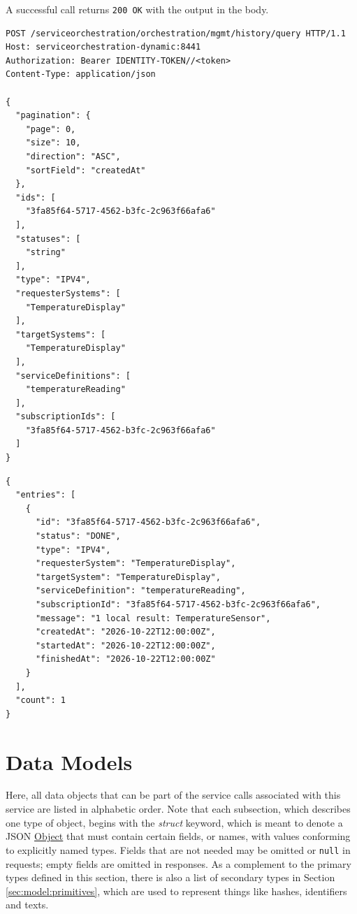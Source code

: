 \documentclass[a4paper]{arrowhead}
\newcommand{\oref}[1]{{\textcolor{ArrowheadBlue}{\hyperref[sec:operations:#1]{#1}}}}
\newcommand{\pref}[1]{{\textcolor{ArrowheadGrey}{\hyperref[sec:model:primitives:#1]{#1}}}}
\begin{document}
A successful call returns \texttt{200 OK} with the output in the body.

\begin{lstlisting}[label={lst:query},caption={An \oref{query} invocation.}]
POST /serviceorchestration/orchestration/mgmt/history/query HTTP/1.1
Host: serviceorchestration-dynamic:8441
Authorization: Bearer IDENTITY-TOKEN//<token>
Content-Type: application/json

{
  "pagination": {
    "page": 0,
    "size": 10,
    "direction": "ASC",
    "sortField": "createdAt"
  },
  "ids": [
    "3fa85f64-5717-4562-b3fc-2c963f66afa6"
  ],
  "statuses": [
    "string"
  ],
  "type": "IPV4",
  "requesterSystems": [
    "TemperatureDisplay"
  ],
  "targetSystems": [
    "TemperatureDisplay"
  ],
  "serviceDefinitions": [
    "temperatureReading"
  ],
  "subscriptionIds": [
    "3fa85f64-5717-4562-b3fc-2c963f66afa6"
  ]
}
\end{lstlisting}

\begin{lstlisting}[label={lst:query-resp},caption={An \oref{query} response.}]
{
  "entries": [
    {
      "id": "3fa85f64-5717-4562-b3fc-2c963f66afa6",
      "status": "DONE",
      "type": "IPV4",
      "requesterSystem": "TemperatureDisplay",
      "targetSystem": "TemperatureDisplay",
      "serviceDefinition": "temperatureReading",
      "subscriptionId": "3fa85f64-5717-4562-b3fc-2c963f66afa6",
      "message": "1 local result: TemperatureSensor",
      "createdAt": "2026-10-22T12:00:00Z",
      "startedAt": "2026-10-22T12:00:00Z",
      "finishedAt": "2026-10-22T12:00:00Z"
    }
  ],
  "count": 1
}
\end{lstlisting}

\newpage

\section{Data Models}
\label{sec:model}

Here, all data objects that can be part of the service calls associated with this service are listed in alphabetic order.
Note that each subsection, which describes one type of object, begins with the \textit{struct} keyword, which is meant to denote a JSON \pref{Object} that must contain certain fields, or names, with values conforming to explicitly named types.
Fields that are not needed may be omitted or \texttt{null} in requests; empty fields are omitted in responses.
As a complement to the primary types defined in this section, there is also a list of secondary types in Section \ref{sec:model:primitives}, which are used to represent things like hashes, identifiers and texts.
\end{document}
